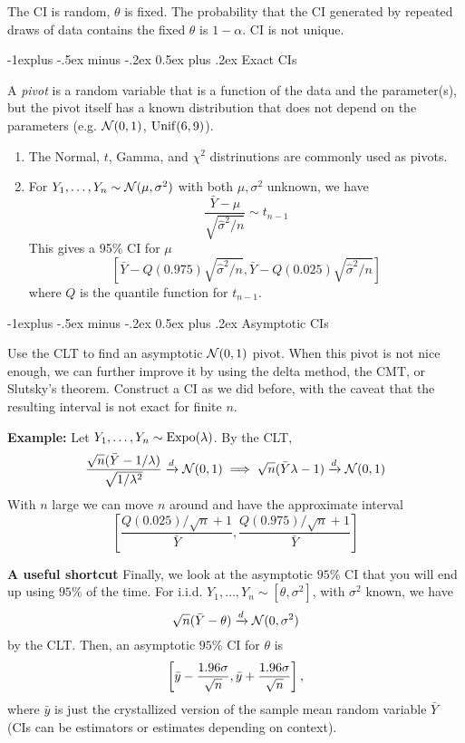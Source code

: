 \documentclass[10pt,landscape]{article}
\makeatletter
\renewcommand{\subsection}{\@startsection{subsection}{2}{0mm}%
                                {-1explus -.5ex minus -.2ex}%
                                {0.5ex plus .2ex}%
                                {\normalfont\normalsize\bfseries}}
\makeatother
\begin{document}
\begin{multicols*}{3}
The CI is random, $\theta$ is fixed. The probability that the CI generated by repeated draws of data contains the fixed $\theta$ is $1-\alpha$. CI is not unique.


\subsection{Exact CIs}

A \emph{pivot} is a random variable that is a function of the data and the parameter(s), but the pivot itself has a known distribution that does not depend on the parameters (e.g. $\mathcal{N}(0,1)$, $\operatorname{Unif}(6,9)$).
\begin{enumerate}
    \item The Normal, $t$, Gamma, and $\chi^2$ distrinutions are commonly used as pivots.
    \item For $Y_1,\ldots,Y_n\sim\mathcal{N}(\mu,\sigma^2)$ with both $\mu,\sigma^2$ unknown, we have
    $$
    \frac{\bar Y-\mu}{\sqrt{\hat\sigma^2/n}}\sim t_{n-1}
    $$
    This gives a 95\% CI for $\mu$
    $$
    [\bar Y-Q(0.975)\sqrt{\hat\sigma^2/n},\bar Y-Q(0.025)\sqrt{\hat\sigma^2/n}]
    $$
    where $Q$ is the quantile function for $t_{n-1}$.
\end{enumerate}
\subsection{Asymptotic CIs}

Use the CLT to find an asymptotic $\mathcal{N}(0,1)$ pivot. When this pivot is not nice enough, we can further improve it by using the delta method, the CMT, or Slutsky's theorem. Construct a CI as we did before, with the caveat that the resulting interval is not exact for finite $n$.

\textbf{Example:} Let $Y_1,\ldots,Y_n\sim \operatorname{Expo}(\lambda)$. By the CLT,
$$
\frac{\sqrt{n}(\bar Y-1/\lambda)}{\sqrt{1/\lambda^2}}\xrightarrow{d}\mathcal{N}(0,1)\implies \sqrt{n}(\bar Y\lambda-1)\xrightarrow{d}\mathcal{N}(0,1)
$$
With $n$ large we can move $n$ around and have the approximate interval
$$
\left[\frac{Q(0.025)/\sqrt{n}+1}{\bar Y},\frac{Q(0.975)/\sqrt{n}+1}{\bar Y}\right]
$$

\textbf{A useful shortcut}
Finally, we look at the asymptotic $95\%$ CI that you will end up using $95\%$ of the time. For i.i.d. $Y_1,\dots,Y_n\sim [\theta,\sigma^2]$, with $\sigma^2$ known, we have $$\sqrt{n}(\bar{Y}-\theta)\xrightarrow{d}\mathcal{N}(0,\sigma^2)$$ by the CLT. Then, an asymptotic $95\%$ CI for $\theta$ is $$\left[ \bar{y}-\frac{1.96\sigma}{\sqrt{n}},\bar{y}+\frac{1.96\sigma}{\sqrt{n}} \right],$$ where $\bar{y}$ is just the crystallized version of the sample mean random variable $\bar{Y}$ (CIs can be estimators or estimates depending on context).


\end{multicols*}
\end{document}
